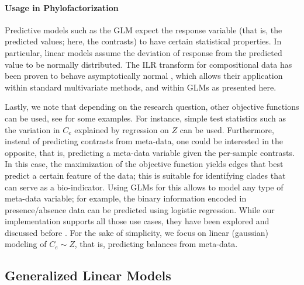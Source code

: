 \paragraph{Usage in Phylofactorization}
\label{sec:Factorization:sub:Methods:sub:ObjectiveFunction:par:Usage}

Predictive models such as the \ac{GLM} expect the response variable (that is, the predicted values; here, the contrasts)
to have certain statistical properties.
In particular, linear models assume the deviation of response from the predicted value to be normally distributed.
The ILR transform for compositional data has been proven to behave asymptotically normal \cite{Egozcue2003,Pawlowsky-Glahn2011a},
which allows their application within standard multivariate methods,
and within \acp{GLM} as presented here.

Lastly, we note that depending on the research question, other objective functions can be used,
see \cite{Washburne2017a,Washburne2018} for some examples.
For instance, simple test statistics such as the variation in $C_e$ explained by regression on $Z$ can be used.
Furthermore, instead of predicting contrasts from meta-data, one could be interested in the opposite,
that is, predicting a meta-data variable given the per-sample contrasts.
In this case, the maximization of the objective function yields edges that best predict a certain feature of the data;
this is suitable for identifying clades that can serve as a bio-indicator.
Using \acp{GLM} for this allows to model any type of meta-data variable;
for example, the binary information encoded in presence/absence data can be predicted using logistic regression.
While our implementation supports all those use cases,
they have been explored and discussed before \cite{Washburne2017a,Washburne2019}.
For the sake of simplicity, we focus on linear (gaussian) modeling of $C_e \sim Z$,
that is, predicting balances from meta-data.


\subsection{Generalized Linear Models}
\label{sec:Factorization:sub:Methods:sub:GLMs}

